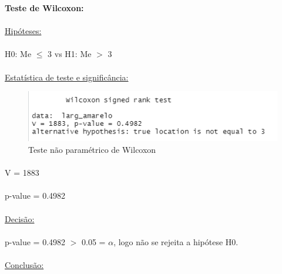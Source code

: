 \documentclass{article}
\begin{document}
\textbf{Teste de Wilcoxon:}
\paragraph{}
\underline{Hipóteses:}
\paragraph{} H0: Me \begin{math}\leq\end{math} 3 vs H1: Me \begin{math}>\end{math} 3


\paragraph{} \underline{Estatística de teste e significância:}

\begin{figure}[h]
       \centering %
        \includegraphics[scale=0.8]{teste_de_hipotese_1a_hipotese.png} 
       \caption{Teste não paramétrico de Wilcoxon}
       \label{fig:logo}
    \end{figure}
    
\paragraph{} V = 1883
\paragraph{} p-value = 0.4982
\paragraph{} \underline{Decisão:}
\paragraph{} p-value = 0.4982 \begin{math}>\end{math} 0.05 = \begin{math}\alpha\end{math}, logo não se rejeita a hipótese H0.
\paragraph{}\underline{Conclusão:}
\end{document}
